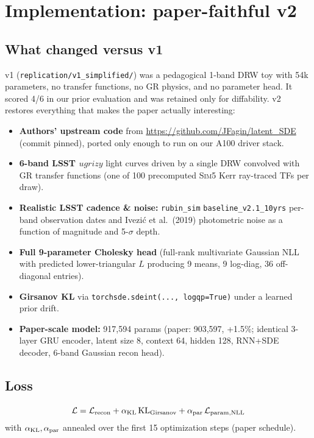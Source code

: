 \documentclass[11pt]{article}
\begin{document}
\section{Implementation: paper-faithful v2}

\subsection{What changed versus v1}
v1 (\texttt{replication/v1\_simplified/}) was a pedagogical 1-band DRW toy with
54k parameters, no transfer functions, no GR physics, and no parameter head.
It scored 4/6 in our prior evaluation and was retained only for diffability.
v2 restores everything that makes the paper actually interesting:
\begin{itemize}
  \item \textbf{Authors' upstream code} from
    \url{https://github.com/JFagin/latent_SDE} (commit pinned), ported only
    enough to run on our A100 driver stack.
  \item \textbf{6-band LSST $ugrizy$} light curves driven by a single DRW
    convolved with GR transfer functions (one of 100 precomputed
    \textsc{Sim5} Kerr ray-traced TFs per draw).
  \item \textbf{Realistic LSST cadence \& noise:} \texttt{rubin\_sim}
    \texttt{baseline\_v2.1\_10yrs} per-band observation dates and Ivezi\'c
    et al.~(2019) photometric noise as a function of magnitude and 5-$\sigma$
    depth.
  \item \textbf{Full 9-parameter Cholesky head} (full-rank multivariate
    Gaussian NLL with predicted lower-triangular $L$ producing 9 means,
    9 log-diag, 36 off-diagonal entries).
  \item \textbf{Girsanov KL} via \texttt{torchsde.sdeint(..., logqp=True)}
    under a learned prior drift.
  \item \textbf{Paper-scale model:} 917{,}594 params (paper: 903{,}597,
    +1.5\%; identical 3-layer GRU encoder, latent size 8, context 64,
    hidden 128, RNN+SDE decoder, 6-band Gaussian recon head).
\end{itemize}

\subsection{Loss}
\[
  \mathcal L = \mathcal L_{\rm recon}
             + \alpha_{\rm KL}\,{\rm KL}_{\rm Girsanov}
             + \alpha_{\rm par}\,\mathcal L_{\rm param,NLL}
\]
with $\alpha_{\rm KL}, \alpha_{\rm par}$ annealed over the first 15
optimization steps (paper schedule).
\end{document}
